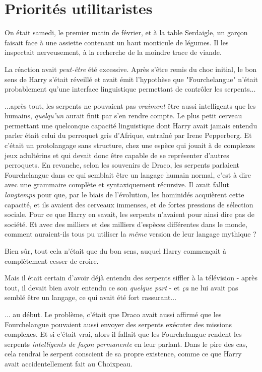 
\chapter{Priorités utilitaristes}

On était samedi, le premier matin de février, et à la table Serdaigle, un garçon faisait face à une assiette contenant un haut monticule de légumes. Il les inspectait nerveusement, à la recherche de la moindre trace de viande.

La réaction avait \emph{peut-être}  été excessive. Après s'être remis du choc initial, le bon sens de Harry s'était réveillé et avait émit l'hypothèse que "Fourchelangue" n'était probablement qu'une interface linguistique permettant de contrôler les serpents...

...après tout, les serpents ne pouvaient pas \emph{vraiment}  être aussi intelligents que les humains, \emph{quelqu'un}  aurait finit par s'en rendre compte. Le plus petit cerveau permettant une quelconque capacité linguistique dont Harry avait jamais entendu parler était celui du perroquet gris d'Afrique, entraîné par Irene Pepperberg. Et c'était un protolangage sans structure, chez une espèce qui jouait à de complexes jeux adultérins et qui devait donc être capable de se représenter d'autres perroquets. En revanche, selon les souvenirs de Draco, les serpents parlaient Fourchelangue dans ce qui semblait être un langage humain normal, c'est à dire avec une grammaire complète et syntaxiquement récursive. Il avait fallut \emph{longtemps}  pour que, par le biais de l'évolution, les hominidés acquièrent cette capacité, et ils avaient des cerveaux immenses, et de fortes pressions de sélection sociale. Pour ce que Harry en savait, les serpents n'avaient pour ainsi dire pas de société. Et avec des milliers et des milliers d'espèces différentes dans le monde, comment auraient-ils tous pu utiliser la \emph{même}  version de leur langage mythique ?

Bien sûr, tout cela n'était que du bon sens, auquel Harry commençait à complètement cesser de croire.

Mais il était certain d'avoir déjà entendu des serpents siffler à la télévision - après tout, il devait bien avoir entendu ce son \emph{quelque part}  - et \emph{ça}  ne lui avait pas semblé être un langage, ce qui avait été fort rassurant...

... au début. Le problème, c'était que Draco avait aussi affirmé que les Fourchelangue pouvaient aussi envoyer des serpents exécuter des missions complexes. Et si c'était vrai, alors il fallait que les Fourchelangue rendent les serpents \emph{intelligents de façon permanente}  en leur parlant. Dans le pire des cas, cela rendrai le serpent conscient de sa propre existence, comme ce que Harry avait accidentellement fait au Choixpeau.

